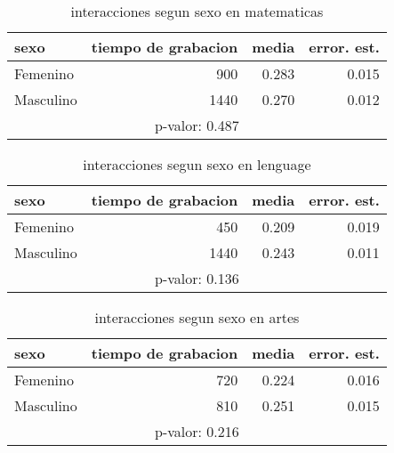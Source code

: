 \documentclass[spanish]{article}
\begin{document}
\begin{table}[h!]
\begin{center}
\begin{tabular}{|l|r|r|r|}
\hline
sexo      & tiempo de grabacion & media          & error. est.    \\ \hline
Femenino  &                 900 &          0.283 &           0.015\\ \hline
Masculino &                1440 &          0.270 &           0.012\\ \hline
\multicolumn{4}{|c|}{p-valor: 0.487} \\ \hline
\end{tabular}
\caption{interacciones segun sexo en matematicas}
\end{center}
\end{table}
\clearpage
\begin{table}[h!]
\begin{center}
\begin{tabular}{|l|r|r|r|}
\hline
sexo      & tiempo de grabacion & media          & error. est.    \\ \hline
Femenino  &                 450 &          0.209 &           0.019\\ \hline
Masculino &                1440 &          0.243 &           0.011\\ \hline
\multicolumn{4}{|c|}{p-valor: 0.136} \\ \hline
\end{tabular}
\caption{interacciones segun sexo en lenguage}
\end{center}
\end{table}

\begin{table}[h!]
\begin{center}
\begin{tabular}{|l|r|r|r|}
\hline
sexo      & tiempo de grabacion & media          & error. est.    \\ \hline
Femenino  &                 720 &          0.224 &           0.016\\ \hline
Masculino &                 810 &          0.251 &           0.015\\ \hline
\multicolumn{4}{|c|}{p-valor: 0.216} \\ \hline
\end{tabular}
\caption{interacciones segun sexo en artes}
\end{center}
\end{table}
\end{document}
